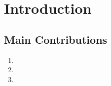 \section{Introduction}\label{sec:introduction}

\subsection{Main Contributions}


\begin{enumerate}
    \item   
    \item   
    \item   
\end{enumerate}

